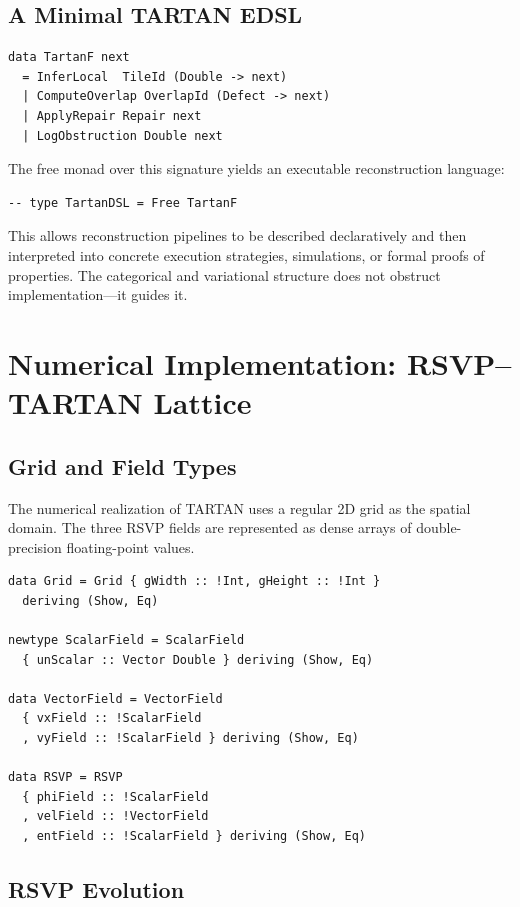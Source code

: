 \documentclass[12pt, oneside]{article}
\begin{document}
\subsection{A Minimal TARTAN EDSL}

\begin{lstlisting}
data TartanF next
  = InferLocal  TileId (Double -> next)
  | ComputeOverlap OverlapId (Defect -> next)
  | ApplyRepair Repair next
  | LogObstruction Double next
\end{lstlisting}

The free monad over this signature yields an executable reconstruction language:
\begin{lstlisting}
-- type TartanDSL = Free TartanF
\end{lstlisting}

This allows reconstruction pipelines to be described declaratively and then interpreted into concrete execution strategies, simulations, or formal proofs of properties. The categorical and variational structure does not obstruct implementation---it guides it.

\section{Numerical Implementation: RSVP--TARTAN Lattice}

\subsection{Grid and Field Types}

The numerical realization of TARTAN uses a regular 2D grid as the spatial domain. The three RSVP fields are represented as dense arrays of double-precision floating-point values.

\begin{lstlisting}
data Grid = Grid { gWidth :: !Int, gHeight :: !Int }
  deriving (Show, Eq)

newtype ScalarField = ScalarField
  { unScalar :: Vector Double } deriving (Show, Eq)

data VectorField = VectorField
  { vxField :: !ScalarField
  , vyField :: !ScalarField } deriving (Show, Eq)

data RSVP = RSVP
  { phiField :: !ScalarField
  , velField :: !VectorField
  , entField :: !ScalarField } deriving (Show, Eq)
\end{lstlisting}

\subsection{RSVP Evolution}
\end{document}
